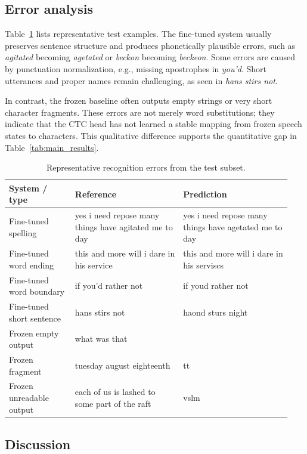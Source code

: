 \documentclass{article}
\begin{document}
\subsection{Error analysis}

Table~\ref{tab:error_examples} lists representative test examples. The fine-tuned system usually preserves sentence structure and produces phonetically plausible errors, such as \textit{agitated} becoming \textit{agetated} or \textit{beckon} becoming \textit{beckeon}. Some errors are caused by punctuation normalization, e.g., missing apostrophes in \textit{you'd}. Short utterances and proper names remain challenging, as seen in \textit{hans stirs not}.

In contrast, the frozen baseline often outputs empty strings or very short character fragments. These errors are not merely word substitutions; they indicate that the CTC head has not learned a stable mapping from frozen speech states to characters. This qualitative difference supports the quantitative gap in Table~\ref{tab:main_results}.

\begin{table}[t]
\centering
\caption{Representative recognition errors from the test subset.}
\label{tab:error_examples}
\begin{tabular}{p{0.22\linewidth}p{0.36\linewidth}p{0.36\linewidth}}
\toprule
System / type & Reference & Prediction \\
\midrule
Fine-tuned spelling & yes i need repose many things have agitated me to day & yes i need repose many things have agetated me to day \\
Fine-tuned word ending & this and more will i dare in his service & this and more will i dare in his serviscs \\
Fine-tuned word boundary & if you'd rather not & if youd rather not \\
Fine-tuned short sentence & hans stirs not & haond sturs night \\
Frozen empty output & what was that & \\
Frozen fragment & tuesday august eighteenth & tt \\
Frozen unreadable output & each of us is lashed to some part of the raft & vslm \\
\bottomrule
\end{tabular}
\end{table}

\subsection{Discussion}
\end{document}
